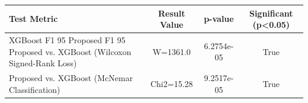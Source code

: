 \begin{tabular}{lccc}
\toprule
Test Metric & Result Value & p-value & Significant (p<0.05) \\
\midrule
XGBoost F1 95%
Proposed F1 95%
Proposed vs. XGBoost (Wilcoxon Signed-Rank Loss) & W=1361.0 & 6.2754e-05 & True \\
Proposed vs. XGBoost (McNemar Classification) & Chi2=15.28 & 9.2517e-05 & True \\
\bottomrule
\end{tabular}
